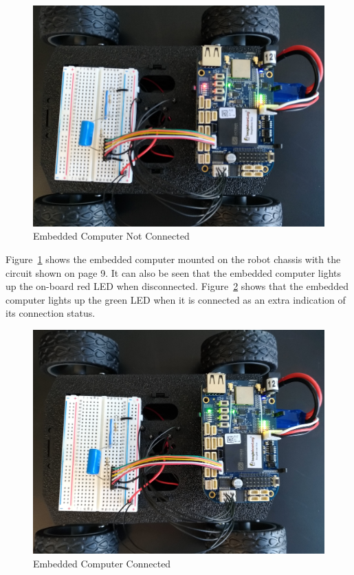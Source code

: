 \begin{figure}[H]
    \centering
    \includegraphics[scale=0.07]{figs/beaglebone/notConnectedSBC.jpg}
    \caption{Embedded Computer Not Connected}
    \label{fig:not_connected_bb}
\end{figure}

Figure~\ref{fig:not_connected_bb} shows the embedded computer mounted on the robot chassis with the circuit shown on page 9. It can also be seen that the embedded computer lights up the on-board red LED when disconnected. Figure~\ref{fig:connected_bb} shows that the embedded computer lights up the green LED when it is connected as an extra indication of its connection status.

\begin{figure}[H]
    \centering
    \includegraphics[scale=0.07]{figs/beaglebone/connectedSBC.jpg}
    \caption{Embedded Computer Connected}
    \label{fig:connected_bb}
\end{figure}

